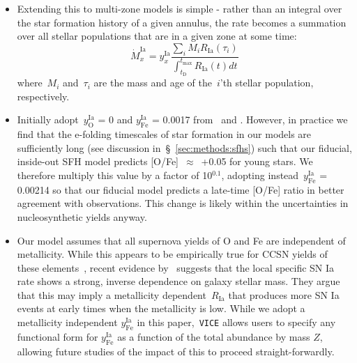 \documentclass[fleqn, usenatbib]{mnras}
\newcommand{\ddfrac}[2]{\frac{\displaystyle #1}{\displaystyle #2}}
\begin{document}
\begin{itemize}
\begin{itemize}
		\item Extending this to multi-zone models is simple - rather than an 
		integral over the star formation history of a given annulus, the rate 
		becomes a summation over all stellar populations that are in a given 
		zone at some time: 
		\begin{equation} 
			\dot{M}_x^\text{Ia} = y_x^\text{Ia} \ddfrac{
				\sum_i M_i R_\text{Ia}(\tau_i) 
			}{
				\int_{t_\text{D}}^{t_\text{max}} R_\text{Ia}(t) dt 
			} 
		\end{equation} 
		where~$M_i$ and~$\tau_i$ are the mass and age of the~$i$'th stellar 
		population, respectively. 

		\item Initially adopt~$y_\text{O}^\text{Ia}$ = 0 and 
		$y_\text{Fe}^\text{Ia}$ = 0.0017 from~\citet{Johnson2020} and 
		\citet{Weinberg2017}. However, in practice we find that the e-folding 
		timescales of star formation in our models are sufficiently long (see 
		discussion in~\S~\ref{sec:methods:sfhs}) such that our fiducial, 
		inside-out SFH model predicts [O/Fe]~$\approx$~+0.05 for 
		young stars. We therefore multiply this value by a factor of 
		10$^{0.1}$, adopting instead~$y_\text{Fe}^\text{Ia}$ = 0.00214 so 
		that our fiducial model predicts a late-time [O/Fe] ratio in better 
		agreement with observations. This change is likely within the 
		uncertainties in nucleosynthetic yields anyway. 

		\item Our model assumes that all supernova yields of O and Fe are 
		independent of metallicity. While this appears to be empirically true 
		for CCSN yields of these elements~\citep[e.g.][]{Weinberg2019, 
		Griffith2020}, recent evidence by~\citet{Brown2019} suggests that 
		the local specific SN Ia rate shows a strong, inverse dependence on 
		galaxy stellar mass. They argue that this may imply a metallicity 
		dependent~$R_\text{Ia}$ that produces more SN Ia events at early times 
		when the metallicity is low. While we adopt a metallicity independent 
		$y_\text{Fe}^\text{Ia}$ in this paper,~\texttt{VICE} allows users to 
		specify any functional form for $y_\text{Fe}^\text{Ia}$ as a function 
		of the total abundance by mass $Z$, allowing future studies of the 
		impact of this to proceed straight-forwardly. 
	\end{itemize} 


\end{itemize}
\end{document}

